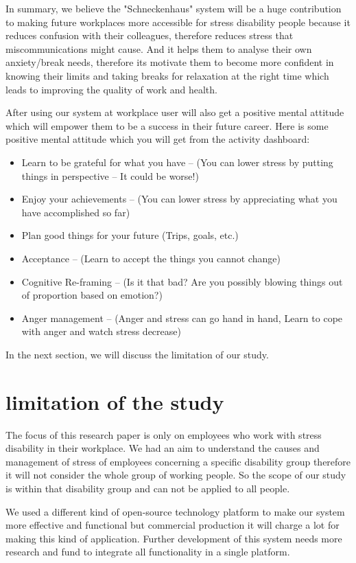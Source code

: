 In summary, we believe the "Schneckenhaus" system will be a huge contribution to making future workplaces more accessible for stress disability people because it reduces confusion with their colleagues, therefore reduces stress that miscommunications might cause. And it helps them to analyse their own anxiety/break needs, therefore its motivate them to become more confident in knowing their limits and taking breaks for relaxation at the right time which leads to improving the quality of work and health.

After using our system at workplace user will also get a positive mental attitude which will empower them to be a success in their future career. Here is some positive mental attitude which you will get from the activity dashboard:
    \begin{itemize}
        \item Learn to be grateful for what you have – (You can lower stress by putting things in perspective – It could be worse!)
        \item Enjoy your achievements – (You can lower stress by appreciating what you have accomplished so far)
        \item Plan good things for your future (Trips, goals, etc.)
        \item Acceptance – (Learn to accept the things you cannot change)
        \item Cognitive Re-framing – (Is it that bad? Are you possibly blowing things out of proportion based on emotion?)
        \item Anger management – (Anger and stress can go hand in hand, Learn to cope with anger and watch stress decrease)
    \end{itemize}
    
In the next section, we will discuss the limitation of our study.


\section{limitation of the study}
The focus of this research paper is only on employees who work with stress disability in their workplace. We had an aim to understand the causes and management of stress of employees concerning a specific disability group therefore it will not consider the whole group of working people. So the scope of our study is within that disability group and can not be applied to all people.

We used a different kind of open-source technology platform to make our system more effective and functional but commercial production it will charge a lot for making this kind of application. Further development of this system needs more research and fund to integrate all functionality in a single platform. 


